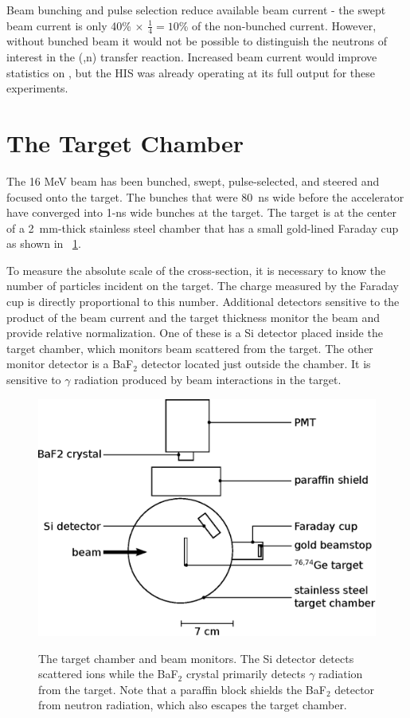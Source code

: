 Beam bunching and pulse selection reduce available beam current - the swept beam current is only 40\% $\times$ $\frac{1}{4} = 10$\% of the non-bunched current.  However, without bunched beam it would not be possible to distinguish the neutrons of interest in the (,n) transfer reaction.  Increased beam current would improve statistics on \reaction, but the HIS was already operating at its full output for these experiments.

\section{The Target Chamber}

The 16 MeV  beam has been bunched, swept, pulse-selected, and steered and focused onto the target.  The bunches that were 80~ns wide before the accelerator have converged into 1-ns wide bunches at the target.  The target is at the center of a 2~mm-thick stainless steel chamber that has a small gold-lined Faraday cup as shown in \fig~\ref{fig:targetChamber}.

To measure the absolute scale of the cross-section, it is necessary to know the number of particles incident on the target.  The charge measured by the Faraday cup is directly proportional to this number.  Additional detectors sensitive to the product of the beam current and the target thickness monitor the beam and provide relative normalization.  One of these is a Si detector placed inside the target chamber, which monitors  beam scattered from the target.  The other monitor detector is a BaF$_2$ detector located just outside the chamber.  It is sensitive to $\gamma$ radiation produced by beam interactions in the target.  
\begin{figure}[htp]
\centering
\includegraphics[width=1.0\textwidth]{figures/targetChamber.eps}
\label{fig:targetChamber}
\caption{The target chamber and beam monitors.  The Si detector detects scattered  ions while the BaF$_2$ crystal primarily detects $\gamma$ radiation from the target.  Note that a paraffin block shields the BaF$_2$ detector from neutron radiation, which also escapes the target chamber.}
\end{figure}


